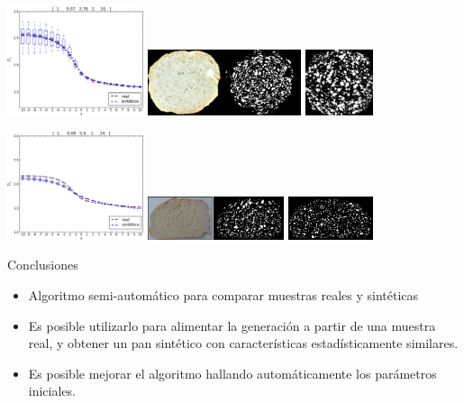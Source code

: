 \documentclass[spanish,unknownkeysallowed]{beamer}
\begin{document}
\begin{frame}
\includegraphics[width=4cm]{../figures/bestboxplot}
\includegraphics[width=4.5cm]{../figures/realbin}
\includegraphics[width=2cm]{../figures/best}

\includegraphics[width=4cm]{../figures/bestboxplot2}
\includegraphics[width=4cm]{../figures/realbin2}
\includegraphics[width=2.5cm]{../figures/best2}
\end{frame}



\begin{frame}{Conclusiones}
\begin{block}{}
\begin{itemize}
\item Algoritmo semi-automático para comparar muestras reales y sintéticas
\item Es posible utilizarlo para alimentar la generación a partir de una muestra real, y obtener un pan sintético con características estadísticamente similares.
\item Es posible mejorar el algoritmo hallando automáticamente los parámetros iniciales.
\end{itemize}
\end{block}

\end{frame}
\end{document}
